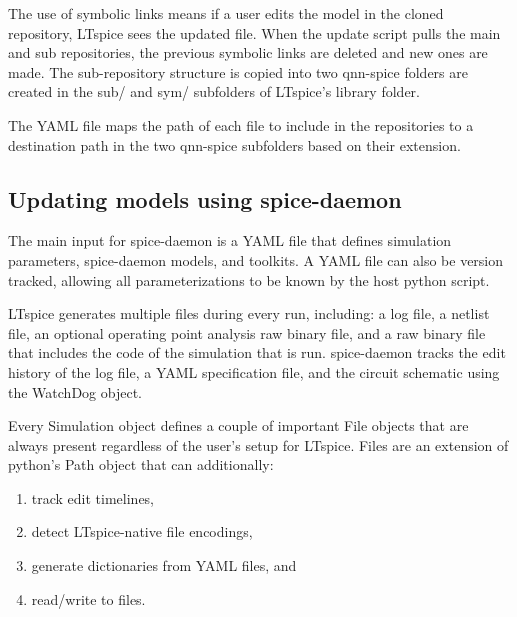 \documentclass{article}
\newcommand{\cf}[1]{\textsf{#1}}
\begin{document}
The use of symbolic links means if a user edits the model in the cloned repository, LTspice sees the updated file.
When the update script pulls the main and sub repositories, the previous symbolic links are deleted and new ones are 
made. The sub-repository structure is copied into two \cf{qnn-spice} folders are created in the \cf{sub/} and \cf{sym/} 
subfolders of LTspice's library folder. 

The YAML file maps the path of each file to include in the repositories to a destination path in the two
\cf{qnn-spice} subfolders based on their extension. 




\subsection{Updating models using spice-daemon}

The main input for spice-daemon is a YAML file that defines simulation parameters, spice-daemon models, and
toolkits. A YAML file can also be version tracked, allowing all parameterizations to be known by the host
python script.

LTspice generates multiple files during every run, including: a log file, a netlist file, an optional 
operating point analysis raw binary file, and a raw binary file that includes the code of the simulation 
that is run. spice-daemon tracks the edit history of the log file, a YAML specification file, and the 
circuit schematic using the \cf{WatchDog} object.

Every \cf{Simulation} object defines a couple of important \cf{File} objects that are always present regardless
of the user's setup for LTspice. \cf{File}s are an extension of python's \cf{Path} object that can additionally:
\begin{enumerate}
    \item track edit timelines,
    \item detect LTspice-native file encodings,
    \item generate dictionaries from YAML files, and
    \item read/write to files.
\end{enumerate}
\end{document}
